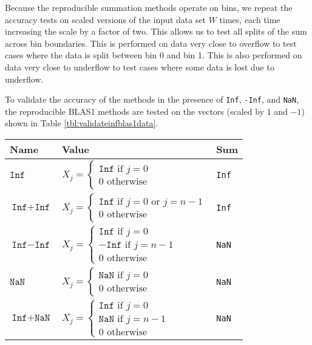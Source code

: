   Because the reproducible summation methods operate on bins, we repeat the accuracy tests on scaled versions of the input data set $W$ times, each time increasing the scale by a factor of two. This allows us to test all splits of the sum across bin boundaries. This is performed on data very close to overflow to test cases where the data is split between bin 0 and bin 1. This is also performed on data very close to underflow to test cases where some data is lost due to underflow.

  To validate the accuracy of the methods in the presence of \texttt{Inf}, \texttt{-Inf}, and \texttt{NaN}, the reproducible BLAS1 methods are tested on the vectors (scaled by $1$ and $-1$) shown in Table \ref{tbl:validateinfblas1data}.
    \begin{table}[!htbp]
        \centering
        \begin{tabular}{ | l |  l | l |} \hline
            Name & Value & Sum\\ \hline
            $\texttt{Inf}$ & $X_j = \begin{cases} \texttt{Inf} \text{ if } j = 0 \\ 0 \text{ otherwise} \end{cases}$ & \texttt{Inf}\\ \hline
            $\texttt{Inf} + \texttt{Inf}$ & $X_j = \begin{cases} \texttt{Inf} \text{ if } j = 0 \text{ or } j = n - 1 \\ 0 \text{ otherwise} \end{cases}$ & \texttt{Inf}\\\hline
            $\texttt{Inf} - \texttt{Inf}$ & $X_j = \begin{cases} \texttt{Inf} \text{ if } j = 0 \\ -\texttt{Inf} \text{ if } j = n - 1 \\ 0 \text{ otherwise} \end{cases}$& \texttt{NaN}\\ \hline
            $\texttt{NaN}$ & $X_j = \begin{cases} \texttt{NaN} \text{ if } j = 0 \\ 0 \text{ otherwise} \end{cases}$& \texttt{NaN}\\ \hline
            $\texttt{Inf} + \texttt{NaN}$ & $X_j = \begin{cases} \texttt{Inf} \text{ if } j = 0 \\ \texttt{NaN} \text{ if } j = n - 1 \\ 0 \text{ otherwise} \end{cases}$& \texttt{NaN}\\ \hline

\end{tabular}
\end{table}
